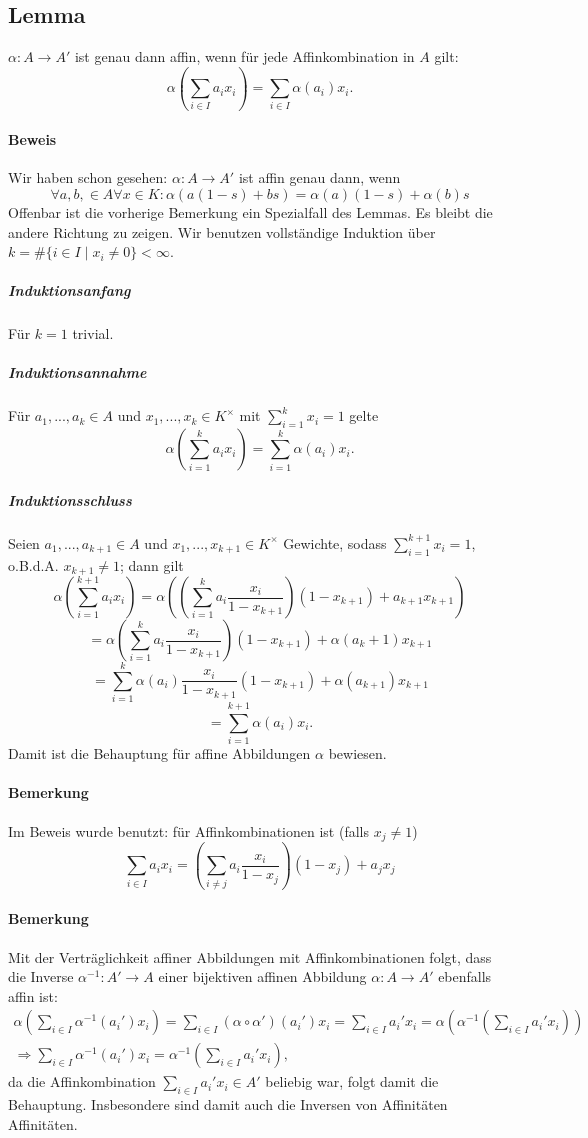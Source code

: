 \subsection{Lemma}
	\begin{Lemma}[]
		$ \alpha:A\to A' $ ist genau dann affin, wenn für jede Affinkombination in $ A $ gilt:
			\[ \alpha(\sum_{i\in I}a_ix_i) = \sum_{i\in I} \alpha(a_i)x_i. \]
	\end{Lemma}
	
\paragraph{Beweis}
	Wir haben schon gesehen: $ \alpha:A\to A' $ ist affin genau dann, wenn
		\[ \forall a,b,\in A\forall x\in K:\alpha(a(1-s)+bs) = \alpha(a)(1-s)+\alpha(b)s \]
	Offenbar ist die vorherige Bemerkung ein Spezialfall des Lemmas. Es bleibt die andere Richtung zu zeigen. Wir benutzen vollständige Induktion über $k = \#\{{i\in I}\mid x_i\neq 0\}<\infty $.
	
\subparagraph{Induktionsanfang}
	Für $ k=1 $ trivial.

\subparagraph{Induktionsannahme}
	Für $ a_1,...,a_k\in A $ und $ x_1,...,x_k \in K^\times$ mit $ \sum_{i=1}^{k}x_i=1 $ gelte
		\[ \alpha(\sum_{i=1}^{k}a_ix_i) = \sum_{i=1}^{k}\alpha(a_i)x_i. \]
	
\subparagraph{Induktionsschluss}
	Seien $ a_1,...,a_{k+1} \in A$ und $ x_1,...,x_{k+1} \in K^\times$ Gewichte, sodass $ \sum_{i=1}^{k+1}x_i = 1 $, o.B.d.A. $ x_{k+1}\neq 1 $; dann gilt
		\[ \alpha(\sum_{i=1}^{k+1}a_ix_i) = \alpha((\sum_{i=1}^{k}a_i\frac{x_i}{1-x_{k+1}})(1-x_{k+1})+a_{k+1}x_{k+1}) \]
		\[ = \alpha(\sum_{i=1}^{k}a_i\frac{x_i}{1-x_{k+1}})(1-x_{k+1})+\alpha(a_k+1)x_{k+1} \]
		\[ = \sum_{i=1}^{k}\alpha(a_i)\frac{x_i}{1-x_{k+1}}(1-x_{k+1})+\alpha(a_{k+1})x_{k+1} \]
		\[ = \sum_{i=1}^{k+1}\alpha(a_i)x_i. \]
	Damit ist die Behauptung für affine Abbildungen $ \alpha $ bewiesen.

\paragraph{Bemerkung}
	Im Beweis wurde benutzt: für Affinkombinationen ist (falls $ x_j \neq 1$)
		\[ \sum_{i\in I}a_ix_i = \left(\sum_{i\neq j}a_i\frac{x_i}{1-x_j}\right)(1-x_j)+a_jx_j \]
\paragraph{Bemerkung}
	Mit der Verträglichkeit affiner Abbildungen mit Affinkombinationen folgt, dass die Inverse $ \alpha^{-1}:A'\to A $ einer bijektiven affinen Abbildung $ \alpha:A\to A' $ ebenfalls affin ist:
		\begin{gather*}
		\alpha\left(\sum_{i\in I} \alpha^{-1}(a_i')x_i\right)=\sum_{i\in I}(\alpha\circ\alpha')(a_i')x_i = \sum_{i\in I}a_i'x_i = \alpha\left(\alpha^{-1}(\sum_{i\in I}a_i'x_i)\right) \\
		\Rightarrow \sum_{i\in I} \alpha^{-1}(a_i')x_i =\alpha^{-1}(\sum_{i\in I}a_i'x_i),
		\end{gather*}
	da die Affinkombination $ \sum_{i\in I}a_i'x_i\in A' $ beliebig war, folgt damit die Behauptung. Insbesondere sind damit auch die Inversen von Affinitäten Affinitäten.
